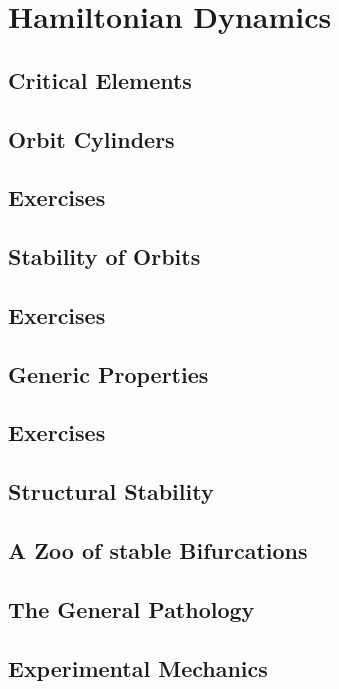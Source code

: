 \chapter{Hamiltonian Dynamics}
\section{Critical Elements}
\section{Orbit Cylinders}
\section*{Exercises}
\section{Stability of Orbits}
\section*{Exercises}
\section{Generic Properties}
\section*{Exercises}
\section{Structural Stability}
\section{A Zoo of stable Bifurcations}
\section{The General Pathology}
\section{Experimental Mechanics}


